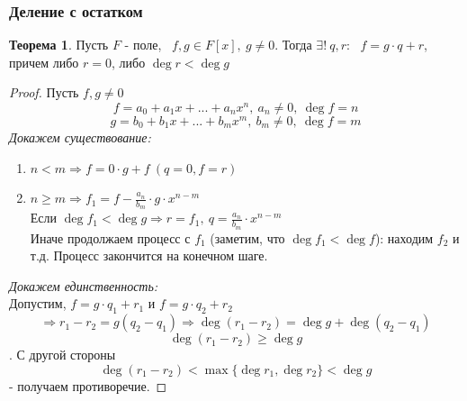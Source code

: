 \documentclass[a4paper, 12pt]{article}
\theoremstyle{definition}
\newtheorem*{theorem}{Теорема}
\begin{document}
  \subsubsection{Деление с остатком}
  \begin{theorem}
    Пусть $F$ - поле, \ $f, g \in F[x],\ g\neq 0 $. Тогда $\exists ! \ q, r$: \ $f = g \cdot q + r$, \\причем либо $r=0$, либо $\deg r < \deg g$       
  \end{theorem}
  \begin{proof}
    Пусть $f, g \neq 0$$$f = a_0 + a_1x+...+a_nx^n, \ a_n \neq 0, \ \deg f = n$$ $$g = b_0 + b_1x+...+b_mx^m, \ b_m \neq 0, \ \deg f = m$$ 
    \textit{Докажем существование:} 
    \begin{enumerate}
      \item $n<m \Longrightarrow f = 0 \cdot g + f \ (q=0, f = r)$
      \item $n\geq m \Longrightarrow f_1 = f - \frac{a_n}{b_m} \cdot g \cdot x^{n-m}$ \\
      Если $\deg f_1 < \deg g \Longrightarrow r = f_1, \ q = \frac{a_n}{b_m}\cdot x^{n-m}$ \\
      Иначе продолжаем процесс с $f_1$ (заметим, что $\deg f_1 < \deg f$): находим $f_2 $ и т.д. Процесс закончится на конечном шаге.  
    \end{enumerate}
    \textit{Докажем единственность:}  \\
    Допустим, $ f = g \cdot q_1 + r_1$ и $f = g \cdot q_2 + r_2$ $$  \Longrightarrow r_1 - r_2 = g(q_2 - q_1) \Longrightarrow \deg (r_1-r_2) = \deg g + \deg (q_2 - q_1) $$ $$\deg(r_1 - r_2) \geq \deg g$$. С другой стороны $$\deg (r_1-r_2) < \max \{\deg r_1, \deg r_2\} < \deg g$$ - получаем противоречие.   
  \end{proof} 
\end{document}
